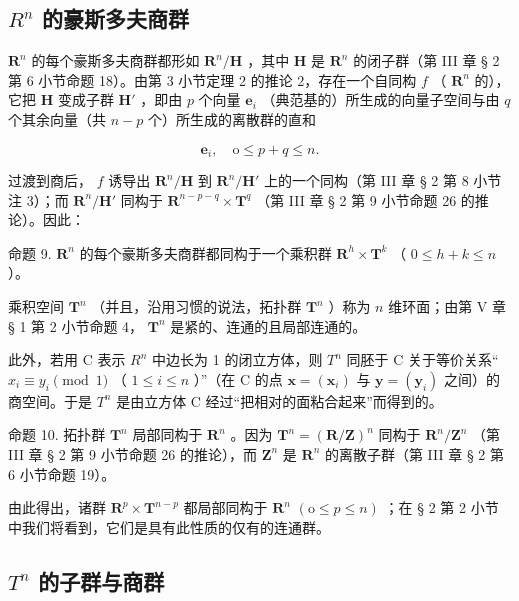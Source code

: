 \subsection{\texorpdfstring{\(R^{n}\) 的豪斯多夫商群}{R 的 n 次幂的豪斯多夫商群}}

\(\mathbf{R}^n\) 的每个豪斯多夫商群都形如 \(\mathbf{R}^n/\mathbf{H}\) ，其中 \(\mathbf{H}\) 是 \(\mathbf{R}^n\) 的闭子群（第 III 章 § 2 第 6 小节命题 18）。由第 3 小节定理 2 的推论 2，存在一个自同构 \(f\) （ \(\mathbf{R}^n\) 的），它把 \(\mathbf{H}\) 变成子群 \(\mathbf{H}'\) ，即由 \(p\) 个向量 \(\boldsymbol{e}_i\) （典范基的）所生成的向量子空间与由 \(q\) 个其余向量（共 \(n-p\) 个）所生成的离散群的直和

\[
\boldsymbol {e} _ {i}, \quad \mathrm{o} \leqslant p + q \leqslant n.
\]

过渡到商后， \(f\) 诱导出 \(\mathbf{R}^n / \mathbf{H}\) 到 \(\mathbf{R}^n / \mathbf{H}'\) 上的一个同构（第 III 章 § 2 第 8 小节注 3）；而 \(\mathbf{R}^n / \mathbf{H}'\) 同构于 \(\mathbf{R}^{n - p - q} \times \mathbf{T}^q\) （第 III 章 § 2 第 9 小节命题 26 的推论）。因此：

命题 9. \(\mathbf{R}^{n}\) 的每个豪斯多夫商群都同构于一个乘积群 \(\mathbf{R}^{h} \times \mathbf{T}^{k}\) （ \(0 \leqslant h + k \leqslant n\) ）。

乘积空间 \(\mathbf{T}^n\) （并且，沿用习惯的说法，拓扑群 \(\mathbf{T}^n\) ）称为 \(n\) 维环面；由第 V 章 § 1 第 2 小节命题 4， \(\mathbf{T}^n\) 是紧的、连通的且局部连通的。

此外，若用 C 表示 \(R^{n}\) 中边长为 1 的闭立方体，则 \(T^{n}\) 同胚于 C 关于等价关系`` \(x_{i} \equiv y_{i} \pmod{1}\) （ \(1 \leqslant i \leqslant n\) ）''（在 C 的点 \(\boldsymbol{x} = (\boldsymbol{x}_{i})\) 与 \(\boldsymbol{y} = (\boldsymbol{y}_{i})\) 之间）的商空间。于是 \(T^{n}\) 是由立方体 C 经过“把相对的面粘合起来”而得到的。

命题 10. 拓扑群 \(\mathbf{T}^n\) 局部同构于 \(\mathbf{R}^n\) 。因为 \(\mathbf{T}^n = (\mathbf{R}/\mathbf{Z})^n\) 同构于 \(\mathbf{R}^n/\mathbf{Z}^n\) （第 III 章 § 2 第 9 小节命题 26 的推论），而 \(\mathbf{Z}^n\) 是 \(\mathbf{R}^n\) 的离散子群（第 III 章 § 2 第 6 小节命题 19）。

由此得出，诸群 \(\mathbf{R}^p\times \mathbf{T}^{n - p}\) 都局部同构于 \(\mathbf{R}^n\) \((\mathrm{o}\leqslant p\leqslant n)\) ；在 § 2 第 2 小节中我们将看到，它们是具有此性质的仅有的连通群。

\subsection{\texorpdfstring{\(T^{n}\) 的子群与商群}{T 的 n 次幂的子群与商群}}

